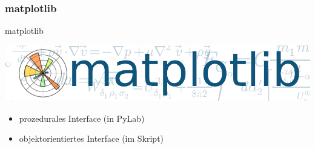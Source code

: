 
\subsubsection{matplotlib}
\begin{frame}{matplotlib}
  \begin{center}
    \includegraphics[width=\textwidth]{../Notes/img/matplotlib.pdf}
  \end{center}
  \begin{itemize}
    \item prozedurales Interface (in PyLab)
    \item objektorientiertes Interface (im Skript)
  \end{itemize}
\end{frame}

